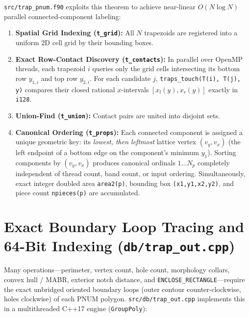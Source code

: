 \texttt{src/trap\_pnum.f90} exploits this theorem to achieve near-linear $O(N \log N)$ parallel connected-component labeling:
\begin{enumerate}
  \item \textbf{Spatial Grid Indexing (\texttt{t\_grid}):} All $N$ trapezoids are registered into a uniform 2D cell grid by their bounding boxes.
  \item \textbf{Exact Row-Contact Discovery (\texttt{t\_contacts}):} In parallel over OpenMP threads, each trapezoid $i$ queries only the grid cells intersecting its bottom row $y_{1,i}$ and top row $y_{2,i}$. For each candidate $j$, \texttt{traps\_touch(T(i), T(j), y)} compares their closed rational $x$-intervals $[x_l(y), x_r(y)]$ exactly in \texttt{i128}.
  \item \textbf{Union-Find (\texttt{t\_union}):} Contact pairs are united into disjoint sets.
  \item \textbf{Canonical Ordering (\texttt{t\_props}):} Each connected component is assigned a unique geometric key: its \emph{lowest, then leftmost} lattice vertex $(v_y, v_x)$ (the left endpoint of a bottom edge on the component's minimum $y_1$). Sorting components by $(v_y, v_x)$ produces canonical ordinals $1 \dots N_p$ completely independent of thread count, band count, or input ordering. Simultaneously, exact integer doubled area \texttt{area2(p)}, bounding box \texttt{(x1,y1,x2,y2)}, and piece count \texttt{npieces(p)} are accumulated.
\end{enumerate}

\section{Exact Boundary Loop Tracing and 64-Bit Indexing (\texttt{db/trap\_out.cpp})}

Many operations---perimeter, vertex count, hole count, morphology collars, convex hull / MABR, exterior notch distance, and \texttt{ENCLOSE\_RECTANGLE}---require the exact unbridged oriented boundary loops (outer contour counter-clockwise, holes clockwise) of each PNUM polygon. \texttt{src/db/trap\_out.cpp} implements this in a multithreaded C++17 engine (\texttt{GroupPoly}):

